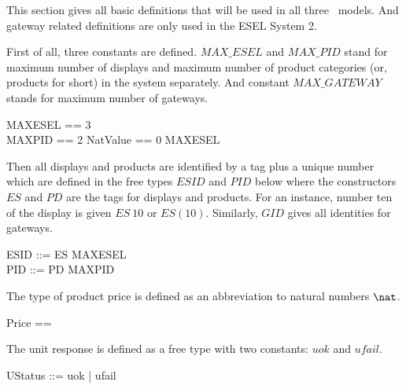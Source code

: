 
This section gives all basic definitions that will be used in all three \Circus\ models. And gateway related definitions are only used in the ESEL System 2.

First of all, three constants are defined. $MAX\_ESEL$ and $MAX\_PID$ stand for maximum number of displays and maximum number of product categories (or, products for short) in the system separately. And constant $MAX\_GATEWAY$ stands for maximum number of gateways.
\begin{zed}
    MAXESEL == 3 \\
\also    MAXPID == 2
NatValue == {0 \upto MAXESEL} \\
\end{zed}

Then all displays and products are identified by a tag plus a unique number which are defined in the free types $ESID$ and $PID$ below where the constructors $ES$ and $PD$ are the tags for displays and products. For an instance, number ten of the display is given $ES~10$ or $ES(10)$. Similarly, $GID$ gives all identities for gateways.
\begin{zed}
    ESID ::= ES  \upto MAXESEL \rdata \\
    PID ::= PD  \upto MAXPID \rdata \\
\end{zed}


The type of product price is defined as an abbreviation to natural numbers $\nat$.
\begin{zed}
    Price == \nat
\end{zed}

The unit response is defined as a free type with two constants: $uok$ and $ufail$.
\begin{zed}
    UStatus ::= uok | ufail
\end{zed}

